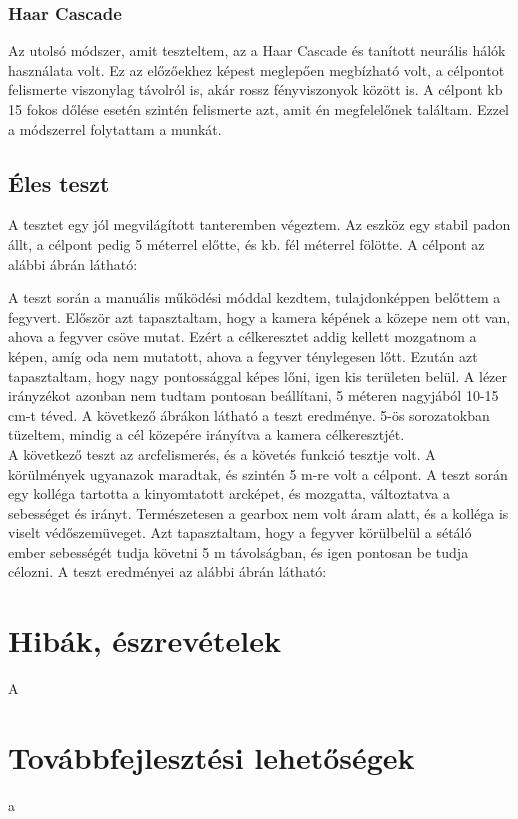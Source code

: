 \documentclass[12pt,a4paper]{article}
\begin{document}
\subsubsection{Haar Cascade}
Az utolsó módszer, amit teszteltem, az a Haar Cascade és tanított neurális hálók használata volt. Ez az előzőekhez képest meglepően megbízható volt, a célpontot felismerte viszonylag távolról is, akár rossz fényviszonyok között is. A célpont kb 15 fokos dőlése esetén szintén felismerte azt, amit én megfelelőnek találtam. Ezzel a módszerrel folytattam a munkát.



\subsection{Éles teszt}
A tesztet egy jól megvilágított tanteremben végeztem. Az eszköz egy stabil padon állt, a célpont pedig 5 méterrel előtte, és kb. fél méterrel fölötte. A célpont az alábbi ábrán látható:

A teszt során a manuális működési móddal kezdtem, tulajdonképpen belőttem a fegyvert. Először azt tapasztaltam, hogy a kamera képének a közepe nem ott van, ahova a fegyver csöve mutat. Ezért a célkeresztet addig kellett mozgatnom a képen, amíg oda nem mutatott, ahova a fegyver ténylegesen lőtt. Ezután azt tapasztaltam, hogy nagy pontossággal képes lőni, igen kis területen belül. A lézer irányzékot azonban nem tudtam pontosan beállítani, 5 méteren nagyjából 10-15 cm-t téved. A következő ábrákon látható a teszt eredménye. 5-ös sorozatokban tüzeltem, mindig a cél közepére irányítva a kamera célkeresztjét. \\

A következő teszt az arcfelismerés, és a követés funkció tesztje volt. A körülmények ugyanazok maradtak, és szintén 5 m-re volt a célpont. A teszt során egy kolléga tartotta a kinyomtatott arcképet, és mozgatta, változtatva a sebességet és irányt. Természetesen a gearbox nem volt áram alatt, és a kolléga is viselt védőszemüveget. Azt tapasztaltam, hogy a fegyver körülbelül a sétáló ember sebességét tudja követni 5 m távolságban, és igen pontosan be tudja célozni. A teszt eredményei az alábbi ábrán látható:

\section{Hibák, észrevételek}
A
\section{Továbbfejlesztési lehetőségek}
a
\end{document}
